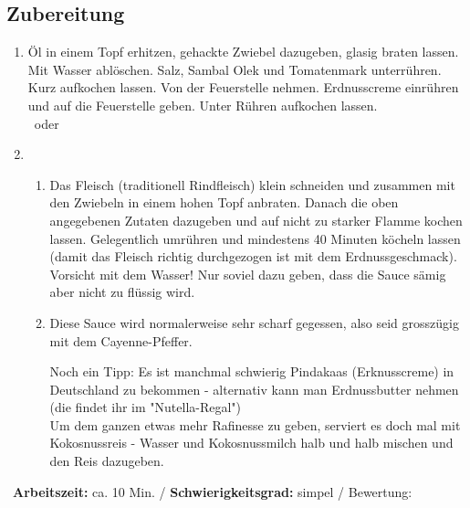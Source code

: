 \begin{minipage}[t]{0.58\textwidth}
\vspace{0pt}
\subsection*{Zubereitung}
\begin{enumerate}[leftmargin=*, itemindent=14pt]
\item Öl in einem Topf erhitzen, gehackte Zwiebel dazugeben, glasig braten lassen. Mit Wasser ablöschen. Salz, Sambal Olek und Tomatenmark unterrühren. Kurz aufkochen lassen. Von der Feuerstelle nehmen. Erdnusscreme einrühren und auf die Feuerstelle geben. Unter Rühren aufkochen lassen.\\

\leafNE\, oder
\item \begin{enumerate}[leftmargin=*, itemindent=18pt]

\item Das Fleisch (traditionell Rindfleisch) klein schneiden und zusammen mit den Zwiebeln in einem hohen Topf anbraten. Danach die oben angegebenen Zutaten dazugeben und auf nicht zu starker Flamme kochen lassen. Gelegentlich umrühren und mindestens 40 Minuten köcheln lassen (damit das Fleisch richtig durchgezogen ist mit dem Erdnussgeschmack). Vorsicht mit dem Wasser! Nur soviel dazu geben, dass die Sauce sämig aber nicht zu flüssig wird. 

\item Diese Sauce wird normalerweise sehr scharf gegessen, also seid grosszügig mit dem Cayenne-Pfeffer.

Noch ein Tipp: Es ist manchmal schwierig Pindakaas (Erknusscreme) in Deutschland zu bekommen - alternativ kann man Erdnussbutter nehmen (die findet ihr im "Nutella-Regal")\\
Um dem ganzen etwas mehr Rafinesse zu geben, serviert es doch mal mit Kokosnussreis - Wasser und Kokosnussmilch halb und halb mischen und den Reis dazugeben. 

\end{enumerate}
\end{enumerate}
\end{minipage}
\vfill
\decothreeright \, \textbf{Arbeitszeit:} ca. 10 Min.	 / \textbf{Schwierigkeitsgrad:} simpel	 / \decothreeleft \hfill Bewertung: \CIRCLE \CIRCLE \LEFTcircle  \Circle \Circle